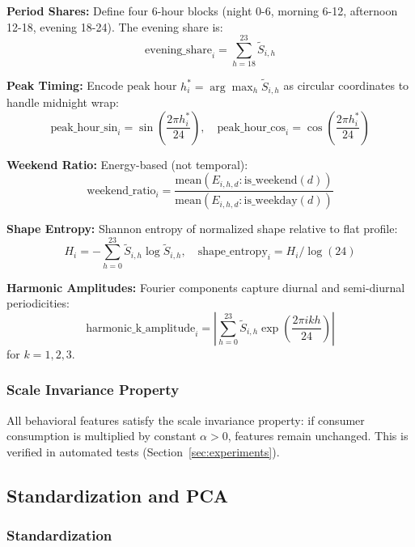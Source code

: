 \textbf{Period Shares:} Define four 6-hour blocks (night 0-6, morning 6-12, afternoon 12-18, evening 18-24). The evening share is:
\begin{equation}
\text{evening\_share}_i = \sum_{h=18}^{23} \tilde{S}_{i,h}
\end{equation}

\textbf{Peak Timing:} Encode peak hour $h^*_i = \arg\max_h \tilde{S}_{i,h}$ as circular coordinates to handle midnight wrap:
\begin{equation}
\text{peak\_hour\_sin}_i = \sin\left(\frac{2\pi h^*_i}{24}\right), \quad
\text{peak\_hour\_cos}_i = \cos\left(\frac{2\pi h^*_i}{24}\right)
\end{equation}

\textbf{Weekend Ratio:} Energy-based (not temporal):
\begin{equation}
\text{weekend\_ratio}_i = \frac{\text{mean}(E_{i,h,d} : \text{is\_weekend}(d))}{\text{mean}(E_{i,h,d} : \text{is\_weekday}(d))}
\end{equation}

\textbf{Shape Entropy:} Shannon entropy of normalized shape relative to flat profile:
\begin{equation}
H_i = -\sum_{h=0}^{23} \tilde{S}_{i,h} \log \tilde{S}_{i,h}, \quad
\text{shape\_entropy}_i = H_i / \log(24)
\end{equation}

\textbf{Harmonic Amplitudes:} Fourier components capture diurnal and semi-diurnal periodicities:
\begin{equation}
\text{harmonic\_k\_amplitude}_i = \left| \sum_{h=0}^{23} \tilde{S}_{i,h} \exp\left(\frac{2\pi i k h}{24}\right) \right|
\end{equation}
for $k = 1, 2, 3$.

\subsubsection{Scale Invariance Property}

All behavioral features satisfy the scale invariance property: if consumer consumption is multiplied by constant $\alpha > 0$, features remain unchanged. This is verified in automated tests (Section~\ref{sec:experiments}).

\subsection{Standardization and PCA}
\label{sec:pca}

\subsubsection{Standardization}

